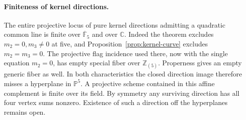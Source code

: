 \paragraph{Finiteness of kernel directions.}
The entire projective locus of pure kernel directions admitting a
quadratic common line is finite over \(\overline{\mathbb F}_5\) and
over \(\mathbb C\). Indeed the theorem excludes \(m_2=0,m_3\ne0\)
at five, and Proposition~\ref{prop:kernel-curve} excludes
\(m_2=m_3=0\). The projective flag incidence used there, now with
the single equation \(m_2=0\), has empty special fiber over
\(\mathbb Z_{(5)}\). Properness gives an empty generic fiber as well.
In both characteristics the closed direction image therefore misses
a hyperplane in \(\mathbb P^5\). A projective scheme contained in
this affine complement is finite over its field. By symmetry any
surviving direction has all four vertex sums nonzero. Existence
of such a direction off the hyperplanes remains open.
